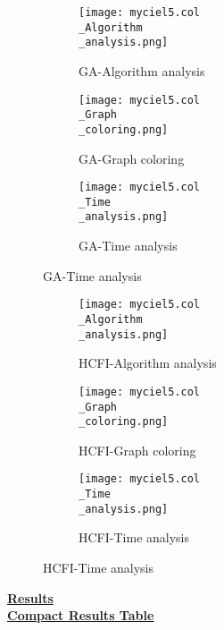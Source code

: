 \documentclass[10pt]{article}
\begin{document}
\graphicspath{{./Core1/Solutions/GA/myciel5.col}}
\begin{figure}[H]
\begin{subfigure}{.33\textwidth}
  \centering
  \texttt{[image: myciel5.col\\\_Algorithm\\\_analysis.png]}
  \caption{GA-Algorithm analysis}
   \label{fig:subfig1}
\end{subfigure}%
\begin{subfigure}{.33\textwidth}
  \centering
  \texttt{[image: myciel5.col\\\_Graph\\\_coloring.png]}
  \caption{GA-Graph coloring}
  \label{fig:subfig2}
\end{subfigure}
\begin{subfigure}{.33\textwidth}
  \centering
  \texttt{[image: myciel5.col\\\_Time\\\_analysis.png]}
  \caption{GA-Time analysis}
  \end{subfigure}
\end{figure}

\graphicspath{{./Core1/Solutions/HCFI/myciel5.col}}
\begin{figure}[H]
\begin{subfigure}{.33\textwidth}
  \centering
  \texttt{[image: myciel5.col\\\_Algorithm\\\_analysis.png]}
  \caption{HCFI-Algorithm analysis}
   \label{fig:subfig1}
\end{subfigure}%
\begin{subfigure}{.33\textwidth}
  \centering
  \texttt{[image: myciel5.col\\\_Graph\\\_coloring.png]}
  \caption{HCFI-Graph coloring}
  \label{fig:subfig2}
\end{subfigure}
\begin{subfigure}{.33\textwidth}
  \centering
  \texttt{[image: myciel5.col\\\_Time\\\_analysis.png]}
  \caption{HCFI-Time analysis}
  \end{subfigure}
\end{figure}
\vspace{2cm}
\begin{center}
\hyperlink{page.8}{\textbf{Results}}\\
\vspace{0.5cm}
\hyperlink{page.71}{\textbf{Compact Results Table}}
\end{center}
\pagebreak
\end{document}

